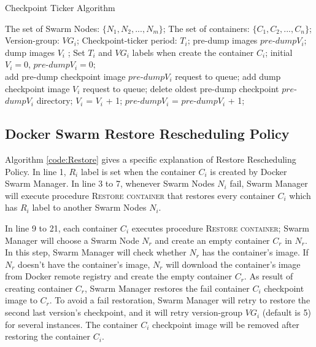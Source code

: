 \begin{algorithm}[h]
    \caption{Checkpoint Ticker Algorithm}
    \label{code:checkpointTicker}
    \begin{algorithmic}[1]
	\Require
		The set of Swarm Nodes: $\lbrace N_1,N_2,...,N_m \rbrace $;
		The set of containers: $\lbrace C_1,C_2,...,C_n \rbrace$;
		Version-group: $ VG_i $;
		Checkpoint-ticker period: $ T_i $;
	\Ensure
		pre-dump images $ pre$-$dump V_i $; dump images $ V_i $ ;
        \State Set $ T_i $ and $ VG_i $ labels when create the container $ C_i $;
        \State initial $ V_i=0 $, $ pre$-$dump V_i=0 $;
        \\
					\State add pre-dump checkpoint image $ pre $-$ dump V_i $ request to queue;
				\EndIf
			\State add dump checkpoint image $ V_i $ request to queue;
                	\State delete oldest pre-dump checkpoint $ pre $-$ dump V_i $ directory;
				\EndIf
            	\State $ V_i $ = $ V_ i$ + 1;
					\State $ pre $-$ dump V_i $ = $ pre $-$ dump V_i $ + 1;
				\EndIf
			\EndWhile
		\EndFor
	\end{algorithmic}
\end{algorithm}

\subsection{Docker Swarm Restore Rescheduling Policy}
Algorithm \ref{code:Restore} gives a specific explanation of Restore Rescheduling Policy. In line 1, $ R_i $ label is set when the container $C_i$ is created by Docker Swarm Manager.
In line 3 to 7, whenever Swarm Nodes $ N_i $ fail, Swarm Manager will execute procedure \textsc{Restore container} that restores every container $ C_i $ which has $ R_i $ label to another Swarm Nodes $ N_i $.

In line 9 to 21, each container $ C_i $ executes procedure \textsc{Restore container}; Swarm Manager will choose a Swarm Node $ N_r $ and create an empty container $ C_r $ in $ N_r $. In this step, Swarm Manager will check whether $ N_r $ has the container's image. If $ N_r $ doesn't have the container's image, $ N_r $ will download the container's image from Docker remote registry and create the empty container $ C_r $.
As result of creating container $ C_r $, Swarm Manager restores the fail container $ C_i $ checkpoint image to $ C_r $. To avoid a fail restoration, Swarm Manager will retry to restore the second last version's checkpoint, and it will retry version-group $ VG_i $ (default is 5) for several instances. The container $ C_i $ checkpoint image will be removed after restoring the container $ C_i $.

